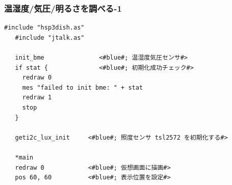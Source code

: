 



\begin{frame}[fragile]
  \frametitle{温湿度/気圧/明るさを調べる-1}
  \begin{lstlisting}[title=\sim/03/sensors.hsp 前半, label=sensors.hsp-1]
   #include "hsp3dish.as"    
   #include "jtalk.as"    

   init_bme               <#blue#; 温湿度気圧センサ#>
   if stat {              <#blue#; 初期化成功チェック#>
     redraw 0          
     mes "failed to init bme: " + stat
     redraw 1
     stop
   }

   geti2c_lux_init     <#blue#; 照度センサ tsl2572 を初期化する#>

   *main
   redraw 0            <#blue#; 仮想画面に描画#>
   pos 60, 60          <#blue#; 表示位置を設定#>
  
  \end{lstlisting}
\end{frame}

